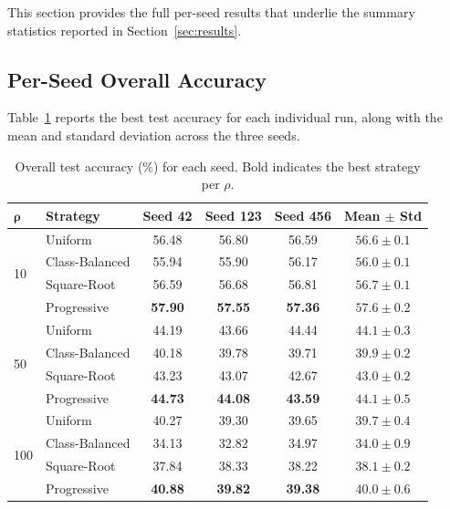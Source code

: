 \documentclass[12pt,a4paper]{article}
\begin{document}
This section provides the full per-seed results that underlie the summary statistics reported in Section~\ref{sec:results}.

\subsection{Per-Seed Overall Accuracy}

Table~\ref{tab:per_seed_overall} reports the best test accuracy for each individual run, along with the mean and standard deviation across the three seeds.

\begin{table}[H]
    \centering
    \caption{Overall test accuracy (\%) for each seed. Bold indicates the best strategy per $\rho$.}
    \label{tab:per_seed_overall}
    \begin{tabular}{llcccc}
        \toprule
        $\boldsymbol{\rho}$ & \textbf{Strategy} & \textbf{Seed 42} & \textbf{Seed 123} & \textbf{Seed 456} & \textbf{Mean $\pm$ Std} \\
        \midrule
        \multirow{4}{*}{10}
        & Uniform        & 56.48 & 56.80 & 56.59 & $56.6 \pm 0.1$ \\
        & Class-Balanced & 55.94 & 55.90 & 56.17 & $56.0 \pm 0.1$ \\
        & Square-Root    & 56.59 & 56.68 & 56.81 & $56.7 \pm 0.1$ \\
        & Progressive    & \textbf{57.90} & \textbf{57.55} & \textbf{57.36} & $\mathbf{57.6 \pm 0.2}$ \\
        \midrule
        \multirow{4}{*}{50}
        & Uniform        & 44.19 & 43.66 & 44.44 & $44.1 \pm 0.3$ \\
        & Class-Balanced & 40.18 & 39.78 & 39.71 & $39.9 \pm 0.2$ \\
        & Square-Root    & 43.23 & 43.07 & 42.67 & $43.0 \pm 0.2$ \\
        & Progressive    & \textbf{44.73} & \textbf{44.08} & \textbf{43.59} & $\mathbf{44.1 \pm 0.5}$ \\
        \midrule
        \multirow{4}{*}{100}
        & Uniform        & 40.27 & 39.30 & 39.65 & $39.7 \pm 0.4$ \\
        & Class-Balanced & 34.13 & 32.82 & 34.97 & $34.0 \pm 0.9$ \\
        & Square-Root    & 37.84 & 38.33 & 38.22 & $38.1 \pm 0.2$ \\
        & Progressive    & \textbf{40.88} & \textbf{39.82} & \textbf{39.38} & $\mathbf{40.0 \pm 0.6}$ \\
        \bottomrule
    \end{tabular}
\end{table}
\end{document}
